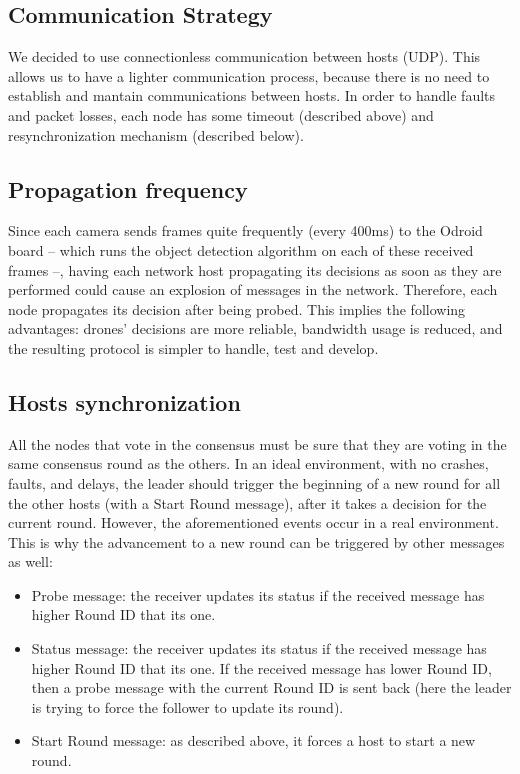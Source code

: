 \documentclass[10pt,conference,compsocconf]{IEEEtran}
\begin{document}
\subsection{Communication Strategy}We decided to use connectionless communication between hosts (UDP). This allows us to have a lighter communication process, because there is no need to establish and mantain communications between hosts. In order to handle faults and packet losses, each node has some timeout (described above) and resynchronization mechanism (described below).
\subsection{Propagation frequency}Since each camera sends frames quite frequently (every 400ms) to the Odroid board -- which runs the object detection algorithm on each of these received frames --, having each network host propagating its decisions as soon as they are performed could cause an explosion of messages in the network. Therefore, each node propagates its decision after being probed. This implies the following advantages: drones' decisions are more reliable, bandwidth usage is reduced, and the resulting protocol is simpler to handle, test and develop.
\subsection{Hosts synchronization}All the nodes that vote in the consensus must be sure that they are voting in the same consensus round as the others. In an ideal environment, with no crashes, faults, and delays, the leader should trigger the beginning of a new round for all the other hosts (with a Start Round message), after it takes a decision for the current round. However, the aforementioned events occur in a real environment. This is why the advancement to a new round can be triggered by other messages as well:
\begin{itemize}
\item Probe message: the receiver updates its status if the received message has higher Round ID that its one.
\item Status message: the receiver updates its status if the received message has higher Round ID that its one. If the received message has lower Round ID, then a probe message with the current Round ID is sent back (here the leader is trying to force the follower to update its round).
\item Start Round message: as described above, it forces a host to start a new round.
\end{itemize}
\end{document}
